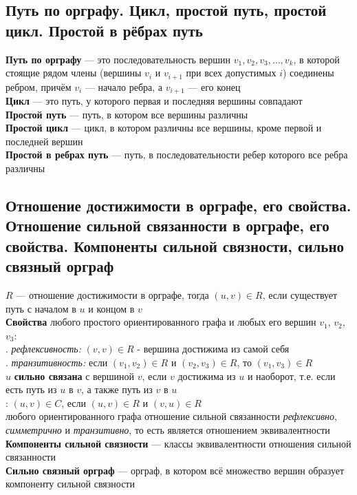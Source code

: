 \documentclass[a4paper]{article}
\begin{document}
\subsection{Путь по орграфу. Цикл, простой путь, простой цикл. Простой в рёбрах путь}
\textbf{Путь по орграфу} — это  последовательность вершин $v_1, v_2, v_3,\ldots, v_k$, в которой стоящие рядом члены (вершины $v_i$ и $v_{i+1}$ при всех допустимых $i$) соединены ребром, причём $v_i$ — начало ребра, а $v_{i+1}$ — его конец\\[2mm]
\indent\textbf{Цикл} — это путь, у которого первая и последняя вершины совпадают\\[2mm]
\indent\textbf{Простой путь} — путь, в котором все вершины различны\\[2mm]
\indent\textbf{Простой цикл} — цикл, в котором различны все вершины, кроме первой и последней вершин\\[2mm]
\indent\textbf{Простой в ребрах путь} — путь, в последовательности ребер которого все ребра различны

\subsection{Отношение достижимости в орграфе, его свойства. Отношение сильной связанности в орграфе, его свойства. Компоненты сильной связности, сильно связный орграф}
$R$ — отношение достижимости в орграфе, тогда $(u,v)\in R$, если существует путь с началом в $u$ и концом в $v$\\[2mm]
\textbf{Свойства} любого простого ориентированного графа и любых его вершин $v_1$, $v_2$, $v_3$:\\[2mm]
. \textit{рефлексивность:} $(v,v)\in R$ - вершина достижима из самой себя\\[2mm]
. \textit{транзитивность:} если $(v_1,v_2)\in R$ и $(v_2,v_3)\in R$, то $(v_1,v_3)\in R$\\[2mm]
 $u$ \textbf{сильно связана }с вершиной $v$, если $v$ достижима из $u$ и наоборот, т.е. если есть путь из $u$ в $v$, а также путь из $v$ в $u$\\[2mm]
: $(u,v)\in C$, если $(u,v)\in R$ и $(v,u)\in R$\\[2mm]
 любого ориентированного графа отношение сильной связанности \textit{рефлексивно}, \textit{симметрично} и \textit{транзитивно}, то есть является отношением эквивалентности\\[2mm]
\indent\textbf{Компоненты сильной связности} — классы эквивалентности отношения сильной связанности\\[2mm]
\indent\textbf{Сильно связный орграф} — орграф, в котором всё множество вершин образует компоненту сильной связности
\end{document}
